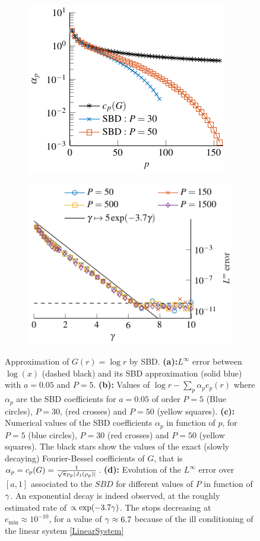 \documentclass[smallextended]{svjour3}
\begin{document}
\begin{figure}[ht]
	\begin{subfigure}[b]{\plotwidth}
		\centering
		\includegraphics[scale = 0.85]{SBDCoeffLog}
		\caption{}	
	\end{subfigure}%
	\begin{subfigure}[b]{\plotwidth}
		\centering
		\includegraphics[scale = 0.85]{ApplicationNumLaplace}
		\caption{}				
		\label{ApplicationNumLaplace}
	\end{subfigure}%
	\caption{Approximation of $G(r) = \log r$ by SBD. \textbf{(a):}$L^{\infty}$ error between $\log(x)$ (dashed black) and its SBD approximation (solid blue) with $a=0.05$ and $P=5$. \textbf{(b):} Values of $\log r - \sum_{p}\alpha_pe_p(r)$ where $\alpha_p$ are the SBD coefficients for $a=0.05$ of order $P=5$ (Blue circles), $P=30$, (red crosses) and $P=50$ (yellow squares). \textbf{(c):} Numerical values of the SBD coefficients $\alpha_p$ in function of $p$, for $P=5$ (blue circles), $P=30$ (red crosses) and $P=  50$ (yellow squares). The black stars show the values of the exact (slowly decaying) Fourier-Bessel coefficients of $G$, that is $\alpha_p = c_p(G) = \frac{1}{\sqrt{\pi}\rho_p \left\lvert J_1(\rho_p) \right\rvert}$. \textbf{(d):} Evolution of the $L^{\infty}$ error over $[a,1]$ associated to the $SBD$ for different values of $P$ in function of $\gamma$. An exponential decay is indeed observed, at the roughly estimated rate of $\propto \exp(-3.7\gamma)$. The stops decreasing at $e_{\min} \approx 10^{-10}$, for a value of $\gamma \approx 6.7$ because of the ill conditioning of the linear system \eqref{LinearSystem}}
	\label{MultiFig}
\end{figure}
\end{document}
